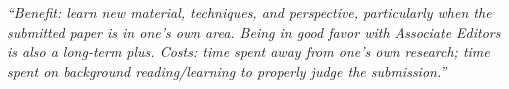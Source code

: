 \documentclass[12pt]{beamer}
\newcommand\ans[1]{{\it ``#1''}}
\newcommand\gap{\vspace{5mm}}
\begin{document}
\begin{frame}
  
  \ans{Benefit:  learn new material, techniques, and perspective, particularly when the submitted paper is in one’s own area.  Being in good favor with Associate Editors is also a  long-term  plus.   Costs:  time  spent  away  from  one’s  own  research;  time  spent  on background reading/learning to properly judge the submission.}











\end{frame}
\end{document}

